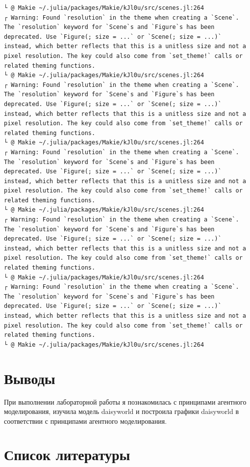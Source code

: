 \documentclass[
  english,
  russian,
  12pt,
  a4paper,
  DIV=11,
  numbers=noendperiod]{scrreprt}
\begin{document}
\begin{verbatim}
└ @ Makie ~/.julia/packages/Makie/kJl0u/src/scenes.jl:264
┌ Warning: Found `resolution` in the theme when creating a `Scene`. The `resolution` keyword for `Scene`s and `Figure`s has been deprecated. Use `Figure(; size = ...` or `Scene(; size = ...)` instead, which better reflects that this is a unitless size and not a pixel resolution. The key could also come from `set_theme!` calls or related theming functions.
└ @ Makie ~/.julia/packages/Makie/kJl0u/src/scenes.jl:264
┌ Warning: Found `resolution` in the theme when creating a `Scene`. The `resolution` keyword for `Scene`s and `Figure`s has been deprecated. Use `Figure(; size = ...` or `Scene(; size = ...)` instead, which better reflects that this is a unitless size and not a pixel resolution. The key could also come from `set_theme!` calls or related theming functions.
└ @ Makie ~/.julia/packages/Makie/kJl0u/src/scenes.jl:264
┌ Warning: Found `resolution` in the theme when creating a `Scene`. The `resolution` keyword for `Scene`s and `Figure`s has been deprecated. Use `Figure(; size = ...` or `Scene(; size = ...)` instead, which better reflects that this is a unitless size and not a pixel resolution. The key could also come from `set_theme!` calls or related theming functions.
└ @ Makie ~/.julia/packages/Makie/kJl0u/src/scenes.jl:264
┌ Warning: Found `resolution` in the theme when creating a `Scene`. The `resolution` keyword for `Scene`s and `Figure`s has been deprecated. Use `Figure(; size = ...` or `Scene(; size = ...)` instead, which better reflects that this is a unitless size and not a pixel resolution. The key could also come from `set_theme!` calls or related theming functions.
└ @ Makie ~/.julia/packages/Makie/kJl0u/src/scenes.jl:264
┌ Warning: Found `resolution` in the theme when creating a `Scene`. The `resolution` keyword for `Scene`s and `Figure`s has been deprecated. Use `Figure(; size = ...` or `Scene(; size = ...)` instead, which better reflects that this is a unitless size and not a pixel resolution. The key could also come from `set_theme!` calls or related theming functions.
└ @ Makie ~/.julia/packages/Makie/kJl0u/src/scenes.jl:264
\end{verbatim}

\chapter{Выводы}\label{ux432ux44bux432ux43eux434ux44b}

При выполнении лабораторной работы я познакомилась с принципами
агентного моделирования, изучила модель daisyworld и построила графики
daisyworld в соответствии с принципами агентного моделирования.

\chapter*{Список
литературы}\label{ux441ux43fux438ux441ux43eux43a-ux43bux438ux442ux435ux440ux430ux442ux443ux440ux44b}

\printbibliography[heading=none]
\end{document}
